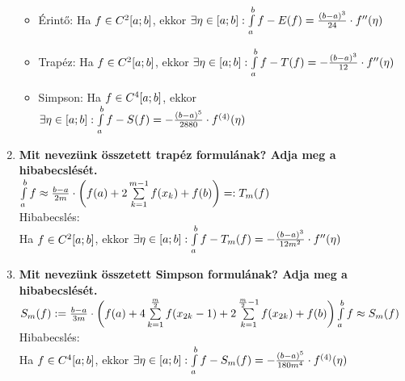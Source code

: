 \documentclass{article}
\begin{document}
\begin{enumerate}
	\begin{itemize}
		\item Érintő: Ha $f\in C^2[a;b]$, ekkor $\exists\eta\in[a;b]:\int\limits_{a}^{b} f-E(f)=
		\frac{(b-a)^3}{24}\cdot f''(\eta)$
		\item Trapéz: Ha $f\in C^2[a;b]$, ekkor $\exists\eta\in[a;b]:\int\limits_{a}^{b} f-T(f)=
		-\frac{(b-a)^3}{12}\cdot f''(\eta)$
		\item Simpson: Ha $f\in C^4[a;b]$, ekkor $\exists\eta\in[a;b]:\int\limits_{a}^{b} f-S(f)=
		-\frac{(b-a)^5}{2880}\cdot f^{(4)}(\eta)$
	\end{itemize}
	\item\textbf{Mit nevezünk összetett trapéz formulának? Adja meg a hibabecslését.}\\[0.1cm]
	$\int\limits_{a}^{b} f\approx\frac{b-a}{2m}\cdot\bigg(f(a)+2\sum\limits_{k=1}^{m-1}
	f(x_k)+f(b)\bigg)=:T_m(f)$\\[0.3cm]Hibabecslés:\\[0.1cm]
	{\Large Ha $f\in C^2[a;b]$, ekkor $\exists\eta\in[a;b]:\int\limits_{a}^{b} f-T_m(f)=-\frac{(b-a)^3}{12m^2}\cdot f''(\eta)$}
	\newpage
	\item\textbf{Mit nevezünk összetett Simpson formulának? Adja meg a hibabecslését.}\\[0.1cm]
	$S_m(f):=\frac{b-a}{3m}\cdot\bigg(f(a)+4\sum\limits_{k=1}^{\frac{m}{2}}
	f(x_{2k}-1)+2\sum\limits_{k=1}^{\frac{m}{2}-1}f(x_{2k})+f(b)\bigg)\\[0.1cm]
	\int\limits_{a}^{b} f\approx S_m(f)$\\[0.3cm]Hibabecslés:\\[0.1cm]
	{\Large Ha $f\in C^4[a;b]$, ekkor $\exists\eta\in[a;b]:\int\limits_{a}^{b} f-S_m(f)=
	-\frac{(b-a)^5}{180m^4}\cdot f^{(4)}(\eta)$}
\end{enumerate}
\end{document}
